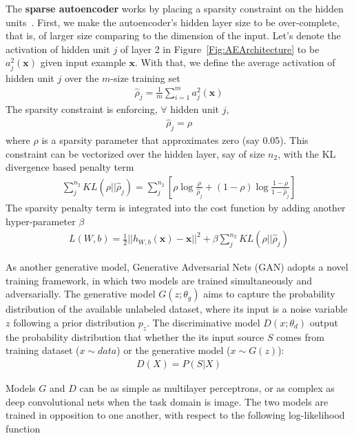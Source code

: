 The \textbf{sparse autoencoder} works by placing a sparsity constraint on the hidden units~\cite{SparseAE}.
First, we make the autoencoder's hidden layer size to be over-complete,
that is, of larger size comparing to the dimension of the input.
Let's denote the activation of hidden unit $j$ of layer 2 in Figure~\ref{Fig:AEArchitecture}
to be $a^2_j(\mathbf{x})$ given input example $\mathbf{x}$.
With that, we define the average activation of hidden unit $j$ over the $m$-size
training set
\begin{align}
    \hat{\rho}_j = \frac{1}{m} \sum_{i=1}^{m} a^2_j(\mathbf{x})
\end{align}
The sparsity constraint is enforcing, $\forall$ hidden unit $j$,
\begin{align}
    \hat{\rho}_j = \rho
\end{align}
where $\rho$ is a sparsity parameter that approximates zero (say 0.05).
This constraint can be vectorized over the hidden layer, say of size $n_2$,
with the KL divergence based penalty term
\begin{align}
    \sum_j^{n_2} KL(\rho || \hat{\rho}_j)
    = \sum_j^{n_2} [\rho \log \frac{\rho}{\hat{\rho}_j} + (1 - \rho) \log \frac{1-\rho}{1-\hat{\rho}_j} ]
\end{align}
The sparsity penalty term is integrated into the cost function by adding another hyper-parameter $\beta$
\begin{align}
    L(W, b) = \frac{1}{2}||h_{W,b}(\mathbf{x}) - \mathbf{x}||^2 +
    \beta \sum_j^{n_2} KL(\rho || \hat{\rho}_j)
\end{align}
\fi

\iffalse
{}
As another generative model, Generative Adversarial Nets (GAN)\cite{GAN} adopts a novel training framework,
in which two models are trained simultaneously and adversarially.
The generative model $G(z;\theta_g)$ aims to capture the probability distribution of the available unlabeled dataset,
where its input is a noise variable $z$ following a prior distribution $p_z$.
The discriminative model $D(x;\theta_d)$ output the probability distribution that whether the its input source $S$ comes
from training dataset ($x\sim data$) or the generative model ($x \sim G(z)$):
\begin{align}
    D(X) = P(S|X)
\end{align}

Models $G$ and $D$ can be as simple as multilayer perceptrons,
or as complex as deep convolutional nets when the task domain is image.
The two models are trained in opposition to one another, with respect to the following log-likelihood function

